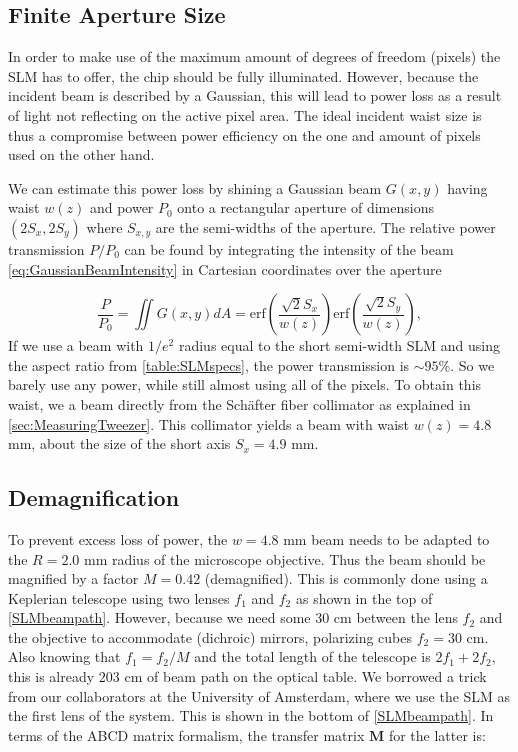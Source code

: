 \subsection{Finite Aperture Size}\label{subsec:ApertureSize}

In order to make use of the maximum amount of degrees of freedom (pixels) the SLM has to offer, the chip should be fully illuminated.
However, because the incident beam is described by a Gaussian, this will lead to power loss as a result of light not reflecting on the active pixel area. 
The ideal incident waist size is thus a compromise between power efficiency on the one and amount of pixels used on the other hand.

We can estimate this power loss by shining a Gaussian beam $G(x,y)$ having waist $w(z)$ and power $P_0$ onto a rectangular aperture of dimensions $(2S_x, 2S_y)$ where $S_{x,y}$ are the semi-widths of the aperture. 
The relative power transmission $P/P_0$ can be found by integrating the intensity of the beam \cref{eq:GaussianBeamIntensity} in Cartesian coordinates over the aperture

\begin{equation}\label{eq:RectAperturePower}
	\frac{P}{P_0} =
	\iint G(x,y) dA=
	\text{erf}\left(\frac{\sqrt{2}S_x}{w(z)}\right) \text{erf}\left(\frac{\sqrt{2}S_y}{w(z)}\right),
\end{equation}
If we use a beam with $1/e^2$ radius equal to the short semi-width SLM and using the aspect ratio from \cref{table:SLMspecs}, the power transmission is $\sim 95$\%.
So we barely use any power, while still almost using all of the pixels.
To obtain this waist, we a beam directly from the Schäfter fiber collimator as explained in \cref{sec:MeasuringTweezer}.
This collimator yields a beam with waist $w(z) = 4.8$ mm, about the size of the short axis $S_x = 4.9$ mm.

\subsection{Demagnification}

To prevent excess loss of power, the $w = 4.8$ mm beam needs to be adapted to the $R = 2.0$ mm radius of the microscope objective. 
Thus the beam should be magnified by a factor $M=0.42$ (demagnified).
This is commonly done using a Keplerian telescope using two lenses $f_1$ and $f_2$ as shown in the top of \cref{SLMbeampath}.
However, because we need some $30$ cm between the lens $f_2$ and the objective to accommodate (dichroic) mirrors, polarizing cubes $f_2=30$ cm. 
Also knowing that $f_1=f_2/M$ and the total length of the telescope is $2f_1+2f_2$, this is already $203$ cm of beam path on the optical table. 
We borrowed a trick from our collaborators at the University of Amsterdam, where we use the SLM as the first lens of the system. 
This is shown in the bottom of \cref{SLMbeampath}.
In terms of the ABCD matrix formalism, the transfer matrix $\mathbf{M}$ for the latter is:

